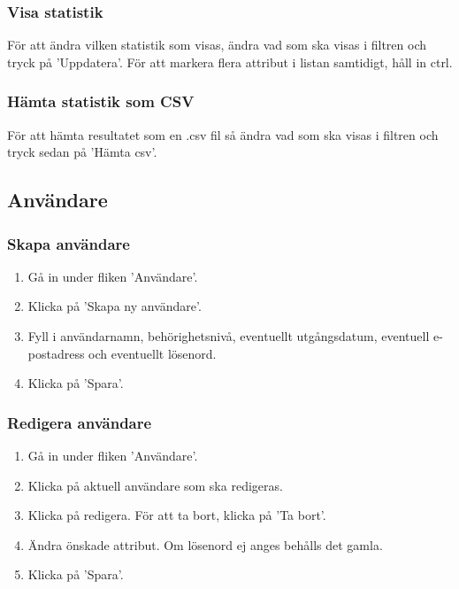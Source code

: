 \documentclass[a4paper, twoside, 11pt, titlepage]{article}
\begin{document}
		\subsubsection{Visa statistik}


		För att ändra vilken statistik som visas, ändra vad som ska visas i filtren och tryck på 'Uppdatera'. För att markera flera attribut i listan samtidigt, håll in ctrl.

		\subsubsection{Hämta statistik som CSV}


		För att hämta resultatet som en .csv fil så ändra vad som ska visas i filtren och tryck sedan på 'Hämta csv'.

	\subsection{Användare}



		\subsubsection{Skapa användare}


		\begin{enumerate}
		\item Gå in under fliken 'Användare'.

		\item Klicka på 'Skapa ny användare'.

		\item Fyll i användarnamn, behörighetsnivå, eventuellt utgångsdatum, eventuell e-postadress och eventuellt lösenord.

		\item Klicka på 'Spara'.
		\end{enumerate}

		\subsubsection{Redigera användare}


		\begin{enumerate}
		\item Gå in under fliken 'Användare'.

		\item Klicka på aktuell användare som ska redigeras.

		\item Klicka på redigera. För att ta bort, klicka på 'Ta bort'.

		\item Ändra önskade attribut. Om lösenord ej anges behålls det gamla.

		\item Klicka på 'Spara'.
		\end{enumerate}
\end{document}

